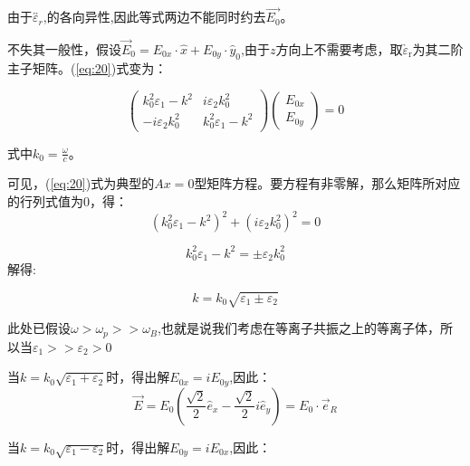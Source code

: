 \documentclass[12pt]{ctexart}
\numberwithin{equation}{section} %
\begin{document}
由于$\overleftrightarrow{\varepsilon_r}$,的各向异性,因此等式两边不能同时约去$\overrightarrow{E_0}$。

不失其一般性，假设$\overrightarrow E_0=E_{0x}\cdot\widehat{x}+E_{0y}\cdot\widehat{y}_{0}$,由于$z$方向上不需要考虑，取$\overleftrightarrow\varepsilon_\mathrm{r}$为其二阶主子矩阵。(\ref{eq:20})式变为：

\begin{equation}
    \left.\left(\begin{matrix}k_{0}^{2}\varepsilon_{1}-k^{2}&i\varepsilon_{2}k_{0}^{2}\\-i\varepsilon_{2}k_{0}^{2}&k_{0}^{2}\varepsilon_{1}-k^{2}\end{matrix}\right.\right) \left(\begin{matrix} E_{0x} \\ E_{0y} \end{matrix}\right)=0
    \label{eq:21}
    \end{equation}
    \par 式中$k_{0}=\frac{\omega}{c}$。
\par 可见，(\ref{eq:20})式为典型的$Ax=0$型矩阵方程。要方程有非零解，那么矩阵所对应的行列式值为0，得：
\begin{equation*}
    \left(k_{0}^{2}\varepsilon_{1}-k^{2}\right)^{2}+\left(i\varepsilon_{2}k_{0}^{2}\right)^{2}=0
    \end{equation*}
    
    \begin{equation*}
    k_{0}^{2}\varepsilon_{1}-k^{2}=\pm\varepsilon_{2}k_{0}^{2}
    \end{equation*}
解得:


\begin{equation}
k=k_{0}\sqrt{\varepsilon_{1}\pm \varepsilon_{2}}
\label{eq:22}
\end{equation}
\par  此处已假设$\omega>\omega_{p}>>\omega_{B}$,也就是说我们考虑在等离子共振之上的等离子体，所以当$\varepsilon_1>>\varepsilon_2>0$

$当k=k_{0}\sqrt{\varepsilon_{1}+\varepsilon_{2}}$时，得出解$E_{0x}=iE_{0y}$,因此：
\begin{equation}
    \overrightarrow{E}=E_{0}\left(\frac{\sqrt{2}}{2}\widehat{e}_{x}-\frac{\sqrt{2}}{2}i\widehat{e}_{y}\right)=E_{0}\cdot\overrightarrow{e}_{R}
    \label{eq:23}
\end{equation}

当$k=k_0\sqrt{\varepsilon_1-\varepsilon_2}$时，得出解$E_{0y}=iE_{0x}$,因此：
\end{document}
